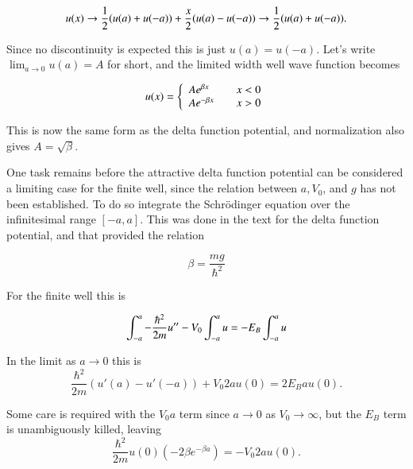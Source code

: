 \begin{equation}\label{eqn:qmIproblemSet4:145}
u(x) \rightarrow \frac{1}{2} (u(a) + u(-a)) + \frac{x}{2} ( u(a) - u(-a) ) \rightarrow \frac{1}{2} (u(a) + u(-a)).
\end{equation}

Since no discontinuity is expected this is just $u(a) = u(-a)$.  Let's write $\lim_{a\rightarrow 0} u(a) = A$ for short, and the limited width well wave function becomes

\begin{equation}\label{eqn:qmIproblemSet4:150}
u(x) =
\left\{
\begin{array}{l l}
A e^{\beta x}
 & \quad \mbox{$x < 0$} \\
A e^{-\beta x}
 & \quad \mbox{$x > 0$} \\
\end{array}
\right.
\end{equation}

This is now the same form as the delta function potential, and normalization also gives $A = \sqrt{\beta}$.

One task remains before the attractive delta function potential can be considered a limiting case for the finite well, since the relation between $a, V_0$, and $g$ has not been established.  To do so integrate the Schr\"{o}dinger equation over the infinitesimal range $[-a,a]$.  This was done in the text for the delta function potential, and that provided the relation

\begin{equation}\label{eqn:qmIproblemSet4:155a}
\beta = \frac{mg}{\hbar^2}
\end{equation}

For the finite well this is

\begin{equation}\label{eqn:qmIproblemSet4:151}
\int_{-a}^a -\frac{\hbar^2}{2m} u'' - V_0 \int_{-a}^a u = -E_B \int_{-a}^a u \\
\end{equation}

In the limit as $a \rightarrow 0$ this is
\begin{equation}\label{eqn:qmIproblemSet4:152}
\frac{\hbar^2}{2m} (u'(a) - u'(-a)) + V_0 2 a u(0) = 2 E_B a u(0).
\end{equation}

Some care is required with the $V_0 a$ term since $a \rightarrow 0$ as $V_0 \rightarrow \infty$, but the $E_B$ term is unambiguously killed, leaving
\begin{equation}\label{eqn:qmIproblemSet4:153}
\frac{\hbar^2}{2m} u(0) (-2\beta e^{-\beta a}) = -V_0 2 a u(0).
\end{equation}

